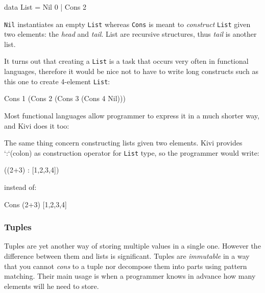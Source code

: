 \documentclass[12pt,a4paper]{report}
\begin{document}
\vspace*{0.2in}
\begin{code}[style=haskell]
data List = Nil 0 | Cons 2
\end{code}

\texttt{Nil} instantiates an empty \texttt{List} whereas \texttt{Cons} is meant
to \textit{construct} \texttt{List} given two elements: the \textit{head} and
\textit{tail}. List are recursive structures, thus \textit{tail} is another
list.

It turns out that creating a \texttt{List} is a task that occurs very often in
functional languages, therefore it would be nice not to have to write long
constructs such as this one to create 4-element \texttt{List}:

\vspace*{0.2in}
\begin{code}[style=haskell]
Cons 1 (Cons 2 (Cons 3 (Cons 4 Nil)))
\end{code}

Most functional languages allow programmer to express it in a much shorter way,
and Kivi does it too:

\vspace*{0.2in}
\begin{code}[style=haskell]
[1, 2, 3, 4]
\end{code}

The same thing concern constructing lists given two elements. Kivi provides
`:`(colon) as construction operator for \texttt{List} type, so the programmer
would write:

\vspace*{0.2in}
\begin{code}[style=haskell]
((2+3) : [1,2,3,4])
\end{code}

instead of:

\vspace*{0.2in}
\begin{code}[style=haskell]
Cons (2+3)  [1,2,3,4]
\end{code}

\subsubsection{Tuples}
Tuples are yet another way of storing multiple values in a single one. However
the difference between them and lists is significant. Tuples are
\textit{immutable} in a way that you cannot \textit{cons} to a tuple nor
decompose them into parts using pattern matching. Their main usage is when a
programmer knows in advance how many elements will he need to store.
\end{document}

